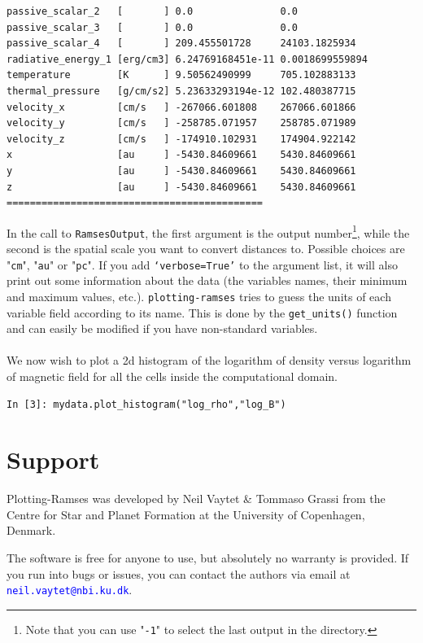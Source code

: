 \documentclass[12pt]{article}
\begin{document}
\begin{lstlisting}
passive_scalar_2   [       ] 0.0               0.0              
passive_scalar_3   [       ] 0.0               0.0              
passive_scalar_4   [       ] 209.455501728     24103.1825934    
radiative_energy_1 [erg/cm3] 6.24769168451e-11 0.0018699559894  
temperature        [K      ] 9.50562490999     705.102883133    
thermal_pressure   [g/cm/s2] 5.23633293194e-12 102.480387715    
velocity_x         [cm/s   ] -267066.601808    267066.601866    
velocity_y         [cm/s   ] -258785.071957    258785.071989    
velocity_z         [cm/s   ] -174910.102931    174904.922142    
x                  [au     ] -5430.84609661    5430.84609661    
y                  [au     ] -5430.84609661    5430.84609661    
z                  [au     ] -5430.84609661    5430.84609661    
============================================
\end{lstlisting}
In the call to \texttt{RamsesOutput}, the first argument is the output number\footnote{Note that you can use "\texttt{-1}" to select the last output in the directory.}, while the second is the spatial scale you want to convert distances to. Possible choices are "\texttt{cm}", "\texttt{au}" or "\texttt{pc}".
If you add \texttt{`verbose=True'} to the argument list, it will also print out some information about the data (the variables names, their minimum and maximum values, etc.). \texttt{plotting-ramses} tries to guess the units of each variable field according to its name. This is done by the \texttt{get\_units()} function and can easily be modified if you have non-standard variables.\\
\\
We now wish to plot a 2d histogram of the logarithm of density versus logarithm of magnetic field for all the cells inside the computational domain.
\begin{lstlisting}
In [3]: mydata.plot_histogram("log_rho","log_B")
\end{lstlisting}

\section{Support}

Plotting-Ramses was developed by Neil Vaytet \& Tommaso Grassi from the Centre for Star and Planet Formation at the University of Copenhagen, Denmark.

\noindent The software is free for anyone to use, but absolutely no warranty is provided. If you run into bugs or issues, you can contact the authors via email at \textcolor{blue}{\texttt{neil.vaytet@nbi.ku.dk}}.
\end{document}
